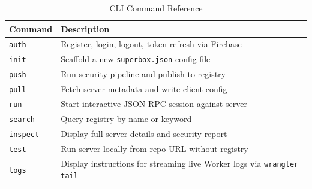 \documentclass[conference]{IEEEtran}
\begin{document}
\begin{table}[htbp]
  \caption{CLI Command Reference}
  \label{tab:cli}
  \centering
  \begin{tabular}{lp{5cm}}
    \toprule
    \textbf{Command} & \textbf{Description} \\
    \midrule
    \texttt{auth}    & Register, login, logout, token refresh via Firebase \\
    \texttt{init}    & Scaffold a new \texttt{superbox.json} config file \\
    \texttt{push}    & Run security pipeline and publish to registry \\
    \texttt{pull}    & Fetch server metadata and write client config \\
    \texttt{run}     & Start interactive JSON-RPC session against server \\
    \texttt{search}  & Query registry by name or keyword \\
    \texttt{inspect} & Display full server details and security report \\
    \texttt{test}    & Run server locally from repo URL without registry \\
    \texttt{logs}    & Display instructions for streaming live Worker logs via \texttt{wrangler tail} \\
    \bottomrule
  \end{tabular}
\end{table}
\end{document}
